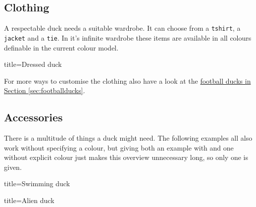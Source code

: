 \documentclass[parskip=half]{scrartcl}
\begin{document}
\subsection{Clothing}

A respectable duck needs a suitable wardrobe. It can choose from a \lstinline|tshirt|, a \lstinline|jacket| and a \lstinline|tie|. In it's infinite wardrobe these items are available in all colours definable in the current colour model.

\begin{tcblisting}{title={Dressed duck}}
\begin{tikzpicture}
	\duck[tshirt]
\end{tikzpicture}
\begin{tikzpicture}
	\duck[jacket]
\end{tikzpicture}

\begin{tikzpicture}
	\duck[tie]
\end{tikzpicture}
\begin{tikzpicture}
	\duck[cape]
\end{tikzpicture}

\begin{tikzpicture}
	\duck[tshirt=lightgray, 
			jacket=blue!50!black, 
			tie=blue!80!black, 
			shorthair]
\end{tikzpicture}
\end{tcblisting}

For more ways to customise the clothing also have a look at the \hyperref[sec:footballducks]{football ducks in Section \ref{sec:footballducks}}.

\clearpage
\subsection{Accessories}
\label{sec:accessories}

There is a multitude of things a duck might need. The following examples all also work without specifying a colour, but giving both an example with and one without explicit colour just makes this overview unnecessary long, so only one is given.

\begin{tcblisting}{title={Swimming duck}}
\begin{tikzpicture}
	\duck[water=cyan!50!blue]
\end{tikzpicture}
\end{tcblisting}

\begin{tcblisting}{title={Alien duck}}
\begin{tikzpicture}
	\duck[alien=green!50!brown]
\end{tikzpicture}
\end{tcblisting}
\end{document}
